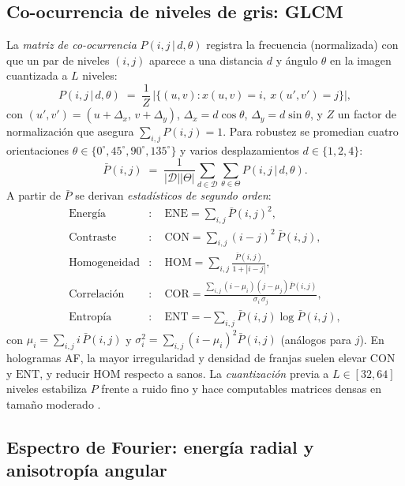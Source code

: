 \subsection{Co-ocurrencia de niveles de gris: GLCM}
\label{subsec:glcm}

La \emph{matriz de co-ocurrencia} $P(i,j\,|\,d,\theta)$ registra la frecuencia (normalizada) con que un par de niveles $(i,j)$ aparece a una distancia $d$ y ángulo $\theta$ en la imagen cuantizada a $L$ niveles:
\begin{equation}
P(i,j\,|\,d,\theta) \;=\; \frac{1}{Z}\,\big|\{(u,v): x(u,v)=i,\ x(u',v')=j\}\big|,
\end{equation}
con $(u',v')=(u+\Delta_x,\,v+\Delta_y)$, $\Delta_x=d\cos\theta$, $\Delta_y=d\sin\theta$, y $Z$ un factor de normalización que asegura $\sum_{i,j}P(i,j)=1$. Para robustez se promedian cuatro orientaciones $\theta\in\{0^\circ,45^\circ,90^\circ,135^\circ\}$ y varios desplazamientos $d\in\{1,2,4\}$:
\[
\bar{P}(i,j) \;=\; \frac{1}{|\mathcal{D}||\Theta|}\sum_{d\in\mathcal{D}}\sum_{\theta\in\Theta} P(i,j\,|\,d,\theta).
\]
A partir de $\bar{P}$ se derivan \emph{estadísticos de segundo orden}:
\begin{align}
\text{Energía} &:\quad \mathrm{ENE}=\sum_{i,j}\bar{P}(i,j)^2,\\
\text{Contraste} &:\quad \mathrm{CON}=\sum_{i,j}(i-j)^2\,\bar{P}(i,j),\\
\text{Homogeneidad} &:\quad \mathrm{HOM}=\sum_{i,j}\frac{\bar{P}(i,j)}{1+|i-j|},\\
\text{Correlación} &:\quad \mathrm{COR}=\frac{\sum_{i,j}(i-\mu_i)(j-\mu_j)\bar{P}(i,j)}{\sigma_i\,\sigma_j},\\
\text{Entropía} &:\quad \mathrm{ENT}=-\sum_{i,j}\bar{P}(i,j)\log \bar{P}(i,j),
\end{align}
con $\mu_i=\sum_{i,j}i\,\bar{P}(i,j)$ y $\sigma_i^2=\sum_{i,j}(i-\mu_i)^2\bar{P}(i,j)$ (análogos para $j$). En hologramas AF, la mayor irregularidad y densidad de franjas suelen elevar $\mathrm{CON}$ y $\mathrm{ENT}$, y reducir $\mathrm{HOM}$ respecto a sanos. La \emph{cuantización} previa a $L\in[32,64]$ niveles estabiliza $P$ frente a ruido fino y hace computables matrices densas en tamaño moderado \cite{Kiani2022TextureSurvey}.

\subsection{Espectro de Fourier: energía radial y anisotropía angular}
\label{subsec:fft}

